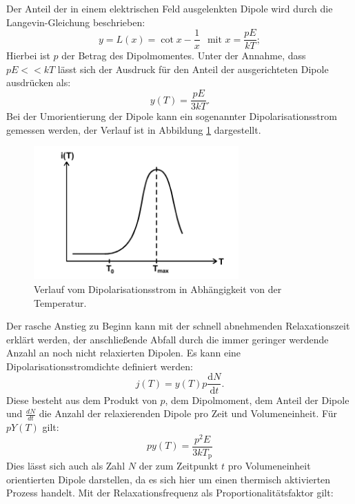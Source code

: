Der Anteil der in einem elektrischen Feld ausgelenkten Dipole wird durch die Langevin-Gleichung beschrieben:
\begin{equation}
  y=L(x)=\cot{x}-\frac{1}{x}\,\,\,\ \text{mit}\,\, x=\frac{pE}{kT};
\end{equation}
Hierbei ist $p$ der Betrag des Dipolmomentes. Unter der Annahme, dass $pE<<kT$ lässt sich der Ausdruck
für den Anteil der ausgerichteten Dipole ausdrücken als:
\begin{equation}
  y(T)=\frac{pE}{3kT}.
\end{equation}
Bei der Umorientierung der Dipole kann ein sogenannter Dipolarisationsstrom gemessen werden, der Verlauf
ist in Abbildung \ref{fig:strom} dargestellt.
\begin{figure}
    \centering
    \includegraphics[width=0.7\textwidth]{strom.PNG}
    \caption{Verlauf vom Dipolarisationsstrom in Abhängigkeit von der Temperatur.\cite{skript}}
    \label{fig:strom}
\end{figure}
Der rasche Anstieg zu Beginn kann mit der schnell abnehmenden Relaxationszeit erklärt werden,
der anschließende Abfall durch die immer geringer werdende Anzahl an noch nicht relaxierten Dipolen.
Es kann eine Dipolarisationsstromdichte definiert werden:
\begin{equation}
  j(T)=y(T)p\frac{\mathrm{d}N}{\mathrm{d}t}\label{eqn:stromdichte}.
\end{equation}
Diese besteht aus dem Produkt von $p$, dem Dipolmoment, dem Anteil der Dipole und $\frac{dN}{dt}$
die Anzahl der relaxierenden Dipole pro Zeit und Volumeneinheit.
Für $pY(T)$ gilt:
\begin{equation}
py(T)=\frac{p^2E}{3kT_\mathrm{p}}\label{eqn:prod}
\end{equation}
Dies lässt sich auch als Zahl $N$ der zum Zeitpunkt $t$ pro Volumeneinheit orientierten Dipole
darstellen, da es sich hier um einen thermisch aktivierten Prozess handelt.
Mit der Relaxationsfrequenz als Proportionalitätsfaktor gilt:
